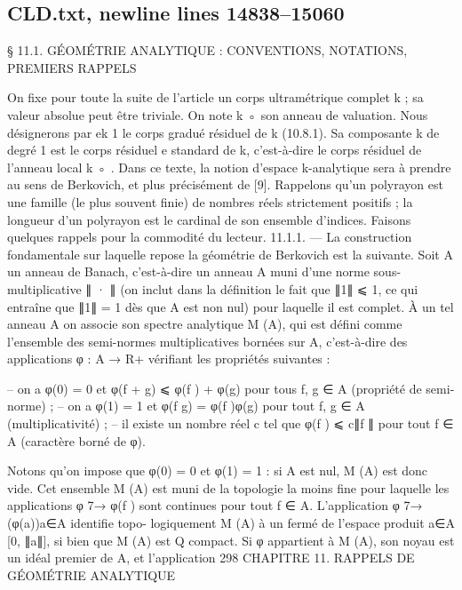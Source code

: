 \documentclass[
  10pt,
]{article}
\newenvironment{Shaded}{}{}
\newcommand{\NormalTok}[1]{#1}
\begin{document}
\subsection{CLD.txt, newline lines
14838--15060}\label{cld.txt-newline-lines-1483815060}

\begin{Shaded}
\begin{Highlighting}[]

\NormalTok{ § 11.1. GÉOMÉTRIE ANALYTIQUE : CONVENTIONS, NOTATIONS,}
\NormalTok{                       PREMIERS RAPPELS}

\NormalTok{   On fixe pour toute la suite de l’article un corps ultramétrique complet k ; sa valeur}
\NormalTok{absolue peut être triviale. On note k ◦ son anneau de valuation. Nous désignerons par ek}
\NormalTok{                                                         1}
\NormalTok{le corps gradué résiduel de k (10.8.1). Sa composante k de degré 1 est le corps résiduel}
\NormalTok{                                                        e}
\NormalTok{standard de k, c’est{-}à{-}dire le corps résiduel de l’anneau local k ◦ .}
\NormalTok{   Dans ce texte, la notion d’espace k{-}analytique sera à prendre au sens de Berkovich,}
\NormalTok{et plus précisément de [9]. Rappelons qu’un polyrayon est une famille (le plus souvent}
\NormalTok{finie) de nombres réels strictement positifs ; la longueur d’un polyrayon est le cardinal}
\NormalTok{de son ensemble d’indices. Faisons quelques rappels pour la commodité du lecteur.}
\NormalTok{11.1.1. — La construction fondamentale sur laquelle repose la géométrie de Berkovich}
\NormalTok{est la suivante. Soit A un anneau de Banach, c’est{-}à{-}dire un anneau A muni d’une norme}
\NormalTok{sous{-}multiplicative ∥ · ∥ (on inclut dans la définition le fait que ∥1∥ ⩽ 1, ce qui entraîne}
\NormalTok{que ∥1∥ = 1 dès que A est non nul) pour laquelle il est complet. À un tel anneau A on}
\NormalTok{associe son spectre analytique M (A), qui est défini comme l’ensemble des semi{-}normes}
\NormalTok{multiplicatives bornées sur A, c’est{-}à{-}dire des applications φ : A → R+ vérifiant les}
\NormalTok{propriétés suivantes :}

\NormalTok{  – on a φ(0) = 0 et φ(f + g) ⩽ φ(f ) + φ(g) pour tous f, g ∈ A (propriété de semi{-}}
\NormalTok{norme) ;}
\NormalTok{  – on a φ(1) = 1 et φ(f g) = φ(f )φ(g) pour tout f, g ∈ A (multiplicativité) ;}
\NormalTok{  – il existe un nombre réel c tel que φ(f ) ⩽ c∥f ∥ pour tout f ∈ A (caractère borné de}
\NormalTok{φ).}

\NormalTok{Notons qu’on impose que φ(0) = 0 et φ(1) = 1 : si A est nul, M (A) est donc vide.}
\NormalTok{Cet ensemble M (A) est muni de la topologie la moins fine pour laquelle les applications}
\NormalTok{φ 7→ φ(f ) sont continues pour tout f ∈ A. L’application φ 7→ (φ(a))a∈A identifie topo{-}}
\NormalTok{logiquement M (A) à un fermé de l’espace produit a∈A [0, ∥a∥], si bien que M (A) est}
\NormalTok{                                                   Q}
\NormalTok{compact. Si φ appartient à M (A), son noyau est un idéal premier de A, et l’application}
\NormalTok{298                   CHAPITRE 11. RAPPELS DE GÉOMÉTRIE ANALYTIQUE}


\end{Highlighting}
\end{Shaded}
\end{document}
